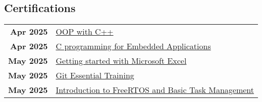 \documentclass[lighthipster]{simplehipstercv}
\begin{document}
\begin{paracol}{2}
\begin{minipage}[t]{0.3\textwidth}
        \section*{Certifications}
        \begin{tabular}{>{\footnotesize\bfseries}r | >{\footnotesize}p{}}
            Apr 2025 & \href{https://www.linkedin.com/learning/certificates/0d2436d703664eda7f28df73ca4216c3d028e37f4785ed9bd46fb9feb3981d10}{OOP with C++} \\
            Apr 2025 & \href{https://www.linkedin.com/learning/certificates/b9326f397277b66a58dfcfd4ea7e9d1ea10154daa7fb4b5c6698e5a81c0a3251}{C programming for Embedded Applications} \\
            May 2025 & \href{https://www.coursera.org/account/accomplishments/verify/6MX1VKYLQDJ7}{Getting started with Microsoft Excel} \\
            May 2025 & \href{https://www.linkedin.com/learning/certificates/d844a5ebadec3231609aad102789b3d830ffc5ab224192d38705e897becb9a0a}{Git Essential Training} \\
            May 2025 & \href{https://www.linkedin.com/learning/certificates/b57bac21a5b840d35eef55d8416340d7978d2904e7969aed7dd1bc2083511b77}{Introduction to FreeRTOS and Basic Task Management} \\
        \end{tabular}
        
        \bigskip
    \end{minipage}
    \hfill
    \begin{minipage}[t]{0.3\textwidth}

\end{minipage}
\end{paracol}
\end{document}
